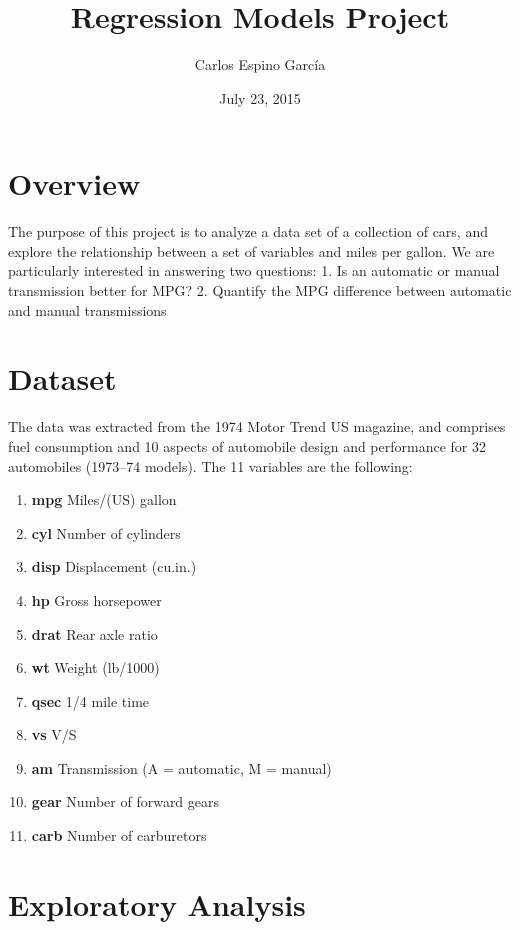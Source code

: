 \documentclass[]{article}
\title{Regression Models Project}
\author{Carlos Espino García}
\date{July 23, 2015}
\begin{document}
\maketitle


\section{Overview}

The purpose of this project is to analyze a data set of a collection of
cars, and explore the relationship between a set of variables and miles
per gallon. We are particularly interested in answering two questions:
1. Is an automatic or manual transmission better for MPG? 2. Quantify
the MPG difference between automatic and manual transmissions

\section{Dataset}

The data was extracted from the 1974 Motor Trend US magazine, and
comprises fuel consumption and 10 aspects of automobile design and
performance for 32 automobiles (1973--74 models). The 11 variables are
the following:

\begin{enumerate}
\def\labelenumi{\arabic{enumi}.}
\itemsep1pt\parskip0pt
\item
  \textbf{mpg} Miles/(US) gallon
\item
  \textbf{cyl} Number of cylinders
\item
  \textbf{disp} Displacement (cu.in.)
\item
  \textbf{hp} Gross horsepower
\item
  \textbf{drat} Rear axle ratio
\item
  \textbf{wt} Weight (lb/1000)
\item
  \textbf{qsec} 1/4 mile time
\item
  \textbf{vs} V/S
\item
  \textbf{am} Transmission (A = automatic, M = manual)
\item
  \textbf{gear} Number of forward gears
\item
  \textbf{carb} Number of carburetors
\end{enumerate}

\section{Exploratory Analysis}
\end{document}
